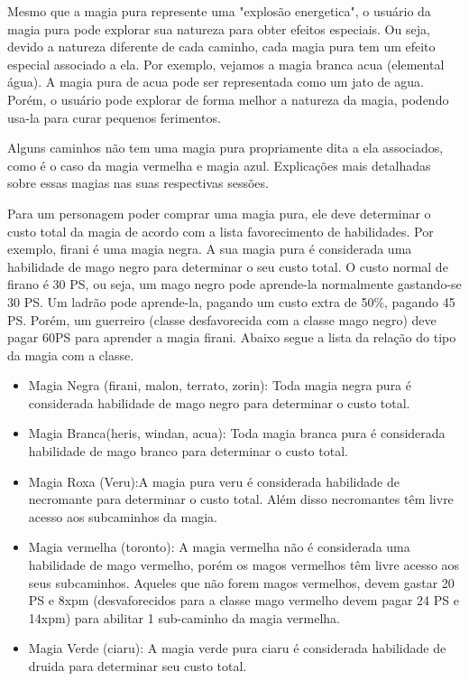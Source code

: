 Mesmo que a magia pura represente uma "explosão energetica", o usuário da magia pura pode explorar sua natureza para obter efeitos especiais. Ou seja, devido a natureza diferente de cada caminho, cada magia pura tem um efeito especial associado a ela. Por exemplo, vejamos a magia branca acua (elemental água). A magia pura de acua pode ser representada como um jato de agua. Porém, o usuário pode explorar de forma melhor a natureza da magia, podendo usa-la para curar pequenos ferimentos.

Alguns caminhos não tem uma magia pura propriamente dita a ela associados, como é o caso da magia vermelha e magia azul. Explicações mais detalhadas sobre essas magias nas suas respectivas sessões.

Para um personagem poder comprar uma magia pura, ele deve determinar o custo total da magia de acordo com a lista favorecimento de habilidades. Por exemplo, firani é uma magia negra. A sua magia pura é considerada uma habilidade de mago negro para determinar o seu custo total. O custo normal de firano é 30 PS, ou seja, um mago negro pode aprende-la normalmente gastando-se 30 PS. Um ladrão pode aprende-la, pagando um custo extra de 50\%, pagando 45 PS. Porém, um guerreiro (classe desfavorecida com a classe mago negro) deve pagar 60PS para aprender a magia firani. Abaixo segue a lista da relação do tipo da magia com a classe.

\begin{itemize}
	\item Magia Negra (firani, malon, terrato, zorin): Toda magia negra pura é considerada habilidade de mago negro para determinar o custo total.

	\item Magia Branca(heris, windan, acua): Toda magia branca pura é considerada habilidade de mago branco para determinar o custo total.

	\item Magia Roxa (Veru):A magia pura veru é considerada habilidade de necromante para determinar o custo total. Além disso necromantes têm livre acesso aos subcaminhos da magia.

	\item Magia vermelha (toronto): A magia vermelha não é considerada uma habilidade de mago vermelho, porém os magos vermelhos têm livre acesso aos seus subcaminhos. Aqueles que não forem magos vermelhos, devem gastar 20 PS e 8xpm (desvaforecidos para a classe mago vermelho devem pagar 24 PS e 14xpm) para abilitar 1 sub-caminho da magia vermelha. 

	\item Magia Verde (ciaru): A magia verde pura ciaru é considerada habilidade de druida para determinar seu custo total.
\end{itemize}

